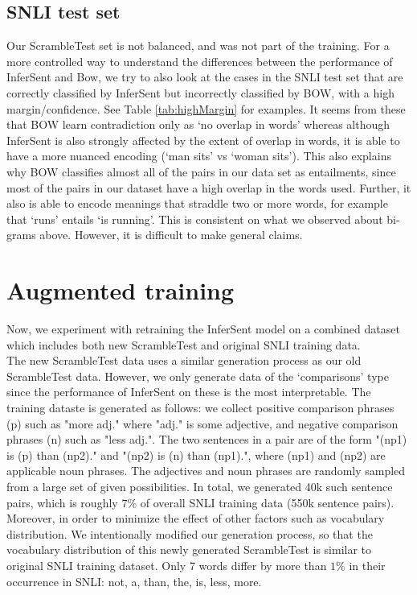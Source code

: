 \documentclass[10pt,letterpaper]{article}
\begin{document}
\subsection{SNLI test set}

Our ScrambleTest set is not balanced, and was not part of the training. For a more controlled way to understand the differences between the performance of InferSent and Bow, we try to also look at the cases in the SNLI test set that are correctly classified by InferSent but incorrectly classified by BOW, with a high margin/confidence. See Table \ref{tab:highMargin} for examples. It seems from these that BOW learn contradiction only as `no overlap in words' whereas although InferSent is also strongly affected by the extent of overlap in words, it is able to have a more nuanced encoding (`man sits' vs `woman sits'). This also explains why BOW classifies almost all of the pairs in our data set as entailments, since most of the pairs in our dataset have a high overlap in the words used. Further, it also is able to encode meanings that straddle two or more words, for example that `runs' entails `is running'. This is consistent on what we observed about bi-grams above. However, it is difficult to make general claims. %

\section{Augmented training}
Now, we experiment with retraining the InferSent model on a combined dataset which includes both new ScrambleTest and original SNLI training data. \\
The new ScrambleTest data uses a similar generation process as our old ScrambleTest data. However, we only generate data of the `comparisons' type since the performance of InferSent on these is the most interpretable. The training dataste is generated as follows: we collect positive comparison phrases (p) such as "more adj." where "adj." is some adjective, and negative comparison phrases (n) such as "less adj.". The two sentences in a pair are of the form "(np1) is (p) than (np2)." and "(np2) is (n) than (np1).", where (np1) and (np2) are applicable noun phrases. The adjectives and noun phrases are randomly sampled from a large set of given possibilities. In total, we generated 40k such sentence pairs, which is roughly $7 \%$ of overall SNLI training data (550k sentence pairs).\\
Moreover, in order to minimize the effect of other factors such as vocabulary distribution. We intentionally modified our generation process, so that the vocabulary distribution of this newly generated ScrambleTest is similar to original SNLI training dataset. Only 7 words differ by more than %
$1 \%$ in their occurrence in SNLI: not, a, than, the, is, less, more. \\
\end{document}
